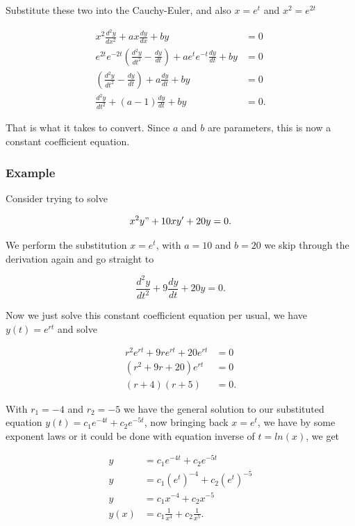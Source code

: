 \documentclass[12pt]{article}
\begin{document}
Substitute these two into the Cauchy-Euler, and also $x=e^t$ and $x^2=e^{2t}$

\begin{align*}
    x^2\frac{d^2y}{dx^2}+ax\frac{dy}{dx}+by&=0 \\
    e^{2t}e^{-2t}\left(\frac{d^2y}{dt^2}-\frac{dy}{dt}\right)+ae^te^{-t}\frac{dy}{dt}+by&=0 \\
    \left(\frac{d^2y}{dt^2}-\frac{dy}{dt}\right)+a\frac{dy}{dt}+by&=0 \\
    \frac{d^2y}{dt^2}+(a-1)\frac{dy}{dt}+by&=0.
\end{align*}

That is what it takes to convert. Since $a$ and $b$ are parameters, this is now a constant coefficient equation.

\subsubsection{Example}

Consider trying to solve

\begin{equation*}
    x^2y"+10xy'+20y=0.
\end{equation*}

We perform the substitution $x=e^t$, with $a=10$ and $b=20$ we skip through the derivation again and go straight to

\begin{equation*}
    \frac{d^2y}{dt^2}+9\frac{dy}{dt}+20y=0.
\end{equation*}

Now we just solve this constant coefficient equation per usual, we have $y(t)=e^{rt}$ and solve

\begin{align*}
    r^2e^{rt}+9re^{rt}+20e^{rt}&=0 \\
    (r^2+9r+20)e^{rt}&=0 \\
    (r+4)(r+5)&=0.
\end{align*}

With $r_1=-4$ and $r_2=-5$ we have the general solution to our substituted equation $y(t)=c_1e^{-4t}+c_2e^{-5t}$, now bringing back $x=e^t$, we have by some exponent laws or it could be done with equation inverse of $t=ln(x)$, we get

\begin{align*}
    y&=c_1e^{-4t}+c_2e^{-5t} \\
    y&=c_1\left(e^{t}\right)^{-4}+c_2\left(e^{t}\right)^{-5} \\
    y&=c_1x^{-4}+c_2x^{-5} \\
    y(x)&=c_1\frac{1}{x^{4}}+c_2\frac{1}{x^{5}}.
\end{align*}
\end{document}
